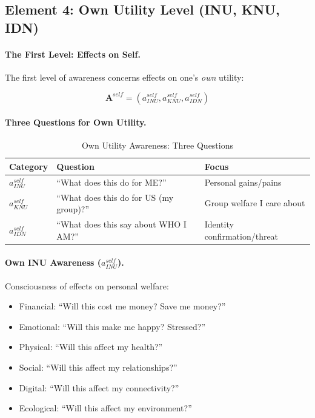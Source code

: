 \subsection{Element 4: Own Utility Level (INU, KNU, IDN)}
\label{subsec:own-utility}

\paragraph{The First Level: Effects on Self.}
The first level of awareness concerns effects on one's \emph{own} utility:

\begin{equation}
\mathbf{A}^{self} = (a^{self}_{INU}, a^{self}_{KNU}, a^{self}_{IDN})
\end{equation}

\paragraph{Three Questions for Own Utility.}

\begin{table}[htbp]
\centering
\caption{Own Utility Awareness: Three Questions}
\label{tab:own-utility-questions}
\renewcommand{\arraystretch}{1.4}
\begin{tabular}{@{}lll@{}}
\toprule
\textbf{Category} & \textbf{Question} & \textbf{Focus} \\
\midrule
$a^{self}_{INU}$ & ``What does this do for ME?'' & Personal gains/pains \\
$a^{self}_{KNU}$ & ``What does this do for US (my group)?'' & Group welfare I care about \\
$a^{self}_{IDN}$ & ``What does this say about WHO I AM?'' & Identity confirmation/threat \\
\bottomrule
\end{tabular}
\end{table}

\paragraph{Own INU Awareness ($a^{self}_{INU}$).}
Consciousness of effects on personal welfare:

\begin{itemize}
\item Financial: ``Will this cost me money? Save me money?''
\item Emotional: ``Will this make me happy? Stressed?''
\item Physical: ``Will this affect my health?''
\item Social: ``Will this affect my relationships?''
\item Digital: ``Will this affect my connectivity?''
\item Ecological: ``Will this affect my environment?''
\end{itemize}

